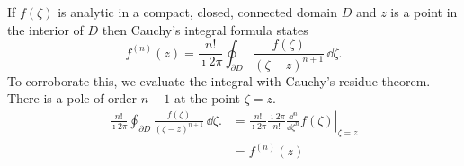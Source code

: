 {\begin{Solution}
  \label{solution cauchy integral formula cauchy residue}
  If $f(\zeta)$ is analytic in a compact, closed, connected domain $D$ 
  and $z$ is a point in the interior of $D$ then Cauchy's integral formula
  states
  \[
  f^{(n)}(z) = \frac{n!}{\imath 2 \pi} \oint_{\partial D} \frac{ f(\zeta) }{ (\zeta - z)^{n+1} } \,\dd \zeta.
  \]
  To corroborate this, we evaluate the integral with Cauchy's residue theorem.
  There is a pole of order $n + 1$ at the point $\zeta = z$.
  \begin{align*}
    \frac{n!}{\imath 2 \pi} \oint_{\partial D} \frac{ f(\zeta) }{ (\zeta - z)^{n+1} } \,\dd \zeta.
    &= \left. \frac{n!}{\imath 2 \pi} \frac{\imath 2 \pi}{n!} \frac{\dd^n}{\dd \zeta^n} f(\zeta)
    \right|_{\zeta = z}
    \\
    &= f^{(n)}(z)
  \end{align*}
\end{Solution}








}
